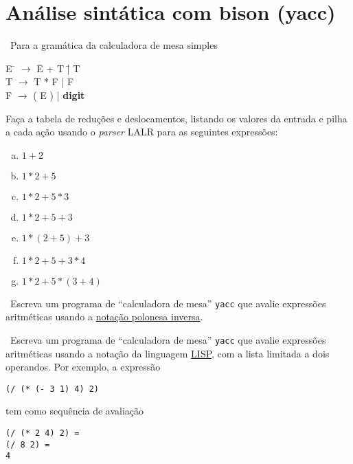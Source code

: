 \section*{Análise sintática com bison (yacc)}

\newexerc~Para a gramática da calculadora de mesa simples

\begin{tabbing}
  E \= $\rightarrow$ \= E + T \= | T \\
  T \> $\rightarrow$ \> T * F \> | F\\
  F \> $\rightarrow$ \> ( E ) \> | {\bf digit}\\
\end{tabbing}

\noindent Faça a tabela de reduções e deslocamentos, listando os
valores da entrada e pilha a cada ação usando o {\it parser\/} LALR
para as seguintes expressões:

\begin{enumerate}[a.]
\item $1 + 2$
\item $1 * 2 + 5$
\item $1 * 2 + 5 * 3$
\item $1 * 2 + 5 + 3$
\item $1 * (2 + 5) + 3$
\item $1 * 2 + 5 + 3 * 4$
\item $1 * 2 + 5 * (3 + 4)$
\end{enumerate}

\newexerc~Escreva um programa de ``calculadora de mesa'' {\tt yacc} que avalie
expressões aritméticas usando a \href{https://pt.wikipedia.org/wiki/Nota%C3%A7%C3%A3o_polonesa_inversa}{notação polonesa inversa}.

\newexerc~Escreva um programa de ``calculadora de mesa'' {\tt yacc}
que avalie expressões aritméticas usando a notação da linguagem
\href{https://pt.wikipedia.org/wiki/Lisp}{LISP}, com a lista limitada
a dois operandos. Por exemplo, a expressão

\begin{center}
\begin{verbatim}
(/ (* (- 3 1) 4) 2)
\end{verbatim}
\end{center}

\noindent tem como sequência de avaliação

\begin{center}
\begin{verbatim}
(/ (* 2 4) 2) =
(/ 8 2) =
4
\end{verbatim}
\end{center}

